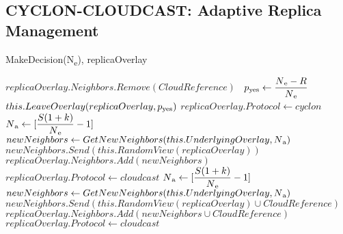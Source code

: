 \documentclass[runningheads]{llncs}
\begin{document}
\subsection{CYCLON-CLOUDCAST: Adaptive Replica Management}

\begin{algorithm}[ht]
\caption{MakeDecision(N\textsubscript{e}), replicaOverlay}
\label{alg:makedecision}
\begin{algorithmic}
        \State $replicaOverlay.Neighbors.Remove(CloudReference)$\
            \State $p\textsubscript{yes} \gets \dfrac{N\textsubscript{e} - R}{N\textsubscript{e}}$
            \State $this.LeaveOverlay(replicaOverlay, p\textsubscript{yes})$
        \State $replicaOverlay.Protocol \gets cyclon$
        \EndIf
        \State $N\textsubscript{a} \gets [\dfrac{S(1 + k)}{N\textsubscript{e}} - 1]$
        \State $newNeighbors \gets GetNewNeighbors(this.UnderlyingOverlay, N\textsubscript{a})$
        \State $newNeighbors.Send(this.RandomView(replicaOverlay))$
        \State $replicaOverlay.Neighbors.Add(newNeighbors)$
        \State $replicaOverlay.Protocol \gets cloudcast$
        \State $N\textsubscript{a} \gets [\dfrac{S(1 + k)}{N\textsubscript{e}} - 1]$
        \State $newNeighbors \gets GetNewNeighbors(this.UnderlyingOverlay, N\textsubscript{a})$
        \State $newNeighbors.Send(this.RandomView(replicaOverlay) \cup CloudReference)$
        \State $replicaOverlay.Neighbors.Add(newNeighbors \cup CloudReference)$
        \State $replicaOverlay.Protocol \gets cloudcast$
    \EndIf
\end{algorithmic}
\end{algorithm}
\end{document}
